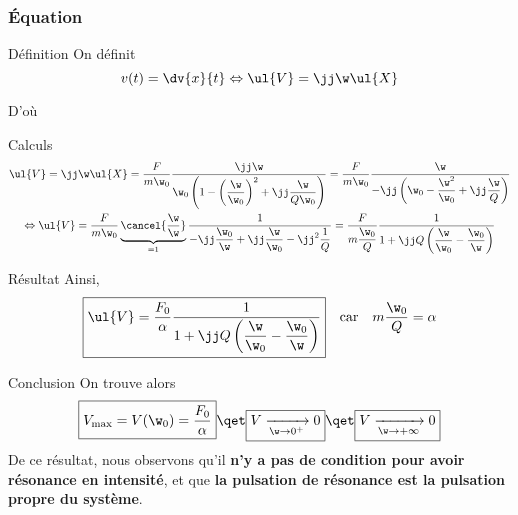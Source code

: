\documentclass[../main/main.tex]{subfiles}
\begin{document}
\subsubsection{Équation}

\begin{rdefi}{\small Définition}
    On définit
    \[v(t) = \dv{x}{t} \Leftrightarrow \ul{V} = \jj\w\ul{X}\]
\end{rdefi}
D'où
\begin{rexem}{Calculs}
    \begin{gather*}
        \ul{V}
            = \jj\w\ul{X}
            = \frac{F}{m\w_0} \frac{\jj\w}{\w_0 \left( 1 -
                \left( \dfrac{\w}{\w_0} \right)^2 + \jj\dfrac{\w}{Q\w_0} \right)}
            = \frac{F}{m\w_0} \frac{\w}{-\jj \left( \w_0 - \dfrac{\w^2}{\w_0} +
                \jj \dfrac{\w}{Q} \right)}\\
        \Leftrightarrow
        \ul{V}
            = \frac{F}{m\w_0} \underbrace{\cancel{\frac{\w}{\w}}}_{=1}
                \frac{1}{-\jj \dfrac{\w_0}{\w} +\jj \dfrac{\w}{\w_0} - \jj^2
                \dfrac{1}{Q}}
            = \frac{F}{m\dfrac{\w_0}{Q}} \frac{1}{1 + \jj Q \left(
                \dfrac{\w}{\w_0} - \dfrac{\w_0}{\w}\right)}
    \end{gather*}
\end{rexem}
\begin{rprop}{Résultat}
    Ainsi,
    \begin{equation*}
        \boxed{
        \ul{V} = \frac{F_0}{\alpha} \frac{1}{1 + \jj Q \left(
                \dfrac{\w}{\w_0} - \dfrac{\w_0}{\w}\right)}}
        \quad\text{car}\quad
        m \frac{\w_0}{Q} = \alpha
    \end{equation*}
\end{rprop}
\begin{rror}{Conclusion}
    On trouve alors
    \[\boxed{
            V_{\max} = V(\w_0) = \frac{F_0}{\alpha}
    }
    \qet
    \boxed{
        V\xrightarrow[\w\rightarrow0^+]{} 0}
    \qet
    \boxed{
        V\xrightarrow[\w\rightarrow+\infty]{} 0}
    \]
    De ce résultat, nous observons qu'il \textbf{n'y a pas de condition pour avoir
    résonance en intensité}, et que \textbf{la pulsation de résonance est la
    pulsation propre du système}.
\end{rror}

\vspace{-25pt}
\end{document}
